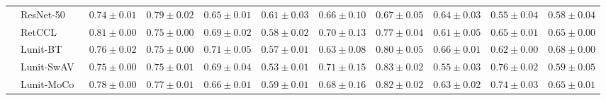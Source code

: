\begin{tabular}{ll|cccc|c|cccc}
 & ResNet-50~\cite{he2015deep} & $0.74 \pm 0.01$ & $\mathbf{0.79 \pm 0.02}$ & $0.65 \pm 0.01$ & $0.61 \pm 0.03$ & $0.66 \pm 0.10$ & $0.67 \pm 0.05$ & $0.64 \pm 0.03$ & $0.55 \pm 0.04$ & $0.58 \pm 0.04$ \\
 & RetCCL~\cite{wang2023retccl} & $0.81 \pm 0.00$ & $0.75 \pm 0.00$ & $0.69 \pm 0.02$ & $0.58 \pm 0.02$ & $0.70 \pm 0.13$ & $0.77 \pm 0.04$ & $0.61 \pm 0.05$ & $0.65 \pm 0.01$ & $0.65 \pm 0.00$ \\
 & Lunit-BT~\cite{kang2023benchmarking} & $0.76 \pm 0.02$ & $0.75 \pm 0.00$ & $0.71 \pm 0.05$ & $0.57 \pm 0.01$ & $0.63 \pm 0.08$ & $0.80 \pm 0.05$ & $0.66 \pm 0.01$ & $0.62 \pm 0.00$ & $0.68 \pm 0.00$ \\
 & Lunit-SwAV~\cite{kang2023benchmarking} & $0.75 \pm 0.00$ & $0.75 \pm 0.01$ & $0.69 \pm 0.04$ & $0.53 \pm 0.01$ & $0.71 \pm 0.15$ & $0.83 \pm 0.02$ & $0.55 \pm 0.03$ & $0.76 \pm 0.02$ & $0.59 \pm 0.05$ \\
 & Lunit-MoCo~\cite{kang2023benchmarking} & $0.78 \pm 0.00$ & $0.77 \pm 0.01$ & $0.66 \pm 0.01$ & $0.59 \pm 0.01$ & $0.68 \pm 0.16$ & $0.82 \pm 0.02$ & $0.63 \pm 0.02$ & $0.74 \pm 0.03$ & $0.65 \pm 0.01$ \\
\cline{1-11}
\bottomrule
\end{tabular}
